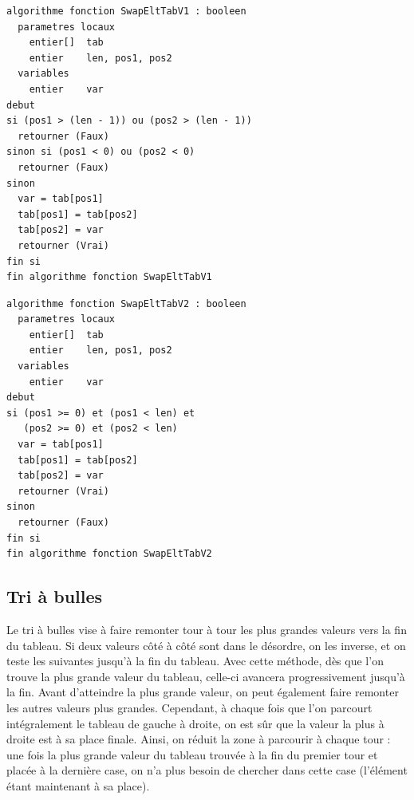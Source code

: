 \documentclass[11pt,a4paper]{article}
\begin{document}
\begin{table}[ht!]
  \centering
\begin{lstlisting}[style=algorithmique]
algorithme fonction SwapEltTabV1 : booleen
  parametres locaux
    entier[]  tab
    entier    len, pos1, pos2
  variables
    entier    var
debut
si (pos1 > (len - 1)) ou (pos2 > (len - 1))
  retourner (Faux)
sinon si (pos1 < 0) ou (pos2 < 0)
  retourner (Faux)
sinon
  var = tab[pos1]
  tab[pos1] = tab[pos2]
  tab[pos2] = var
  retourner (Vrai)
fin si
fin algorithme fonction SwapEltTabV1 \end{lstlisting}
\end{table}

\begin{table}[ht!]
  \centering
\begin{lstlisting}[style=algorithmique]
algorithme fonction SwapEltTabV2 : booleen
  parametres locaux
    entier[]  tab
    entier    len, pos1, pos2
  variables
    entier    var
debut
si (pos1 >= 0) et (pos1 < len) et
   (pos2 >= 0) et (pos2 < len)
  var = tab[pos1]
  tab[pos1] = tab[pos2]
  tab[pos2] = var
  retourner (Vrai)
sinon
  retourner (Faux)
fin si
fin algorithme fonction SwapEltTabV2 \end{lstlisting}
\end{table}

\bigskip

\subsection{Tri à bulles}

Le tri à bulles vise à faire remonter tour à tour les plus grandes valeurs vers la fin du tableau.
Si deux valeurs côté à côté sont dans le désordre, on les inverse, et on teste les suivantes jusqu'à la fin du tableau.
Avec cette méthode, dès que l'on trouve la plus grande valeur du tableau, celle-ci avancera progressivement jusqu'à la fin.
Avant d'atteindre la plus grande valeur, on peut également faire remonter les autres valeurs plus grandes.
Cependant, à chaque fois que l'on parcourt intégralement le tableau de gauche à droite, on est sûr que la valeur la plus à droite est à sa place finale.
Ainsi, on réduit la zone à parcourir à chaque tour : une fois la plus grande valeur du tableau trouvée à la fin du premier tour et placée à la dernière case, on n'a plus besoin de chercher dans cette case (l'élément étant maintenant à sa place).
\end{document}
